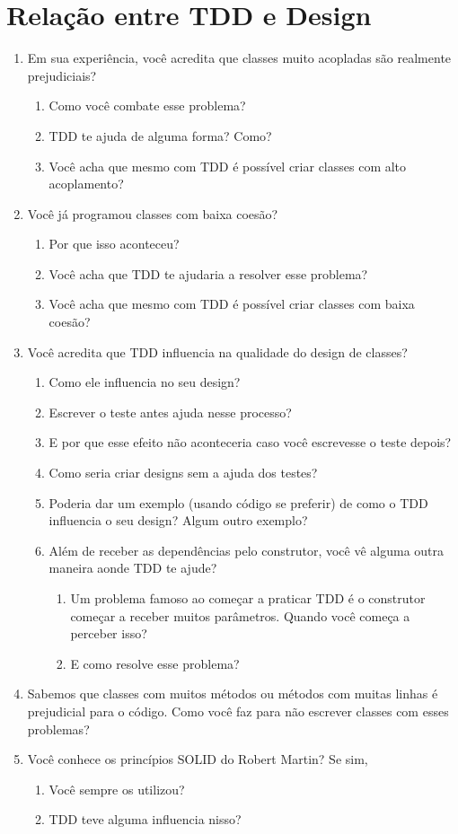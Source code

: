 \section{Relação entre TDD e Design}

\begin{enumerate}
	\item{Em sua experiência, você acredita que classes muito acopladas são realmente prejudiciais?}
		\begin{enumerate}
			\item Como você combate esse problema?
			\item TDD te ajuda de alguma forma? Como?
			\item Você acha que mesmo com TDD é possível criar classes com alto acoplamento? 
		\end{enumerate}
	\item{Você já programou classes com baixa coesão?}
		\begin{enumerate}
			\item Por que isso aconteceu?
			\item Você acha que TDD te ajudaria a resolver esse problema?
			\item Você acha que mesmo com TDD é possível criar classes com baixa coesão? 
		\end{enumerate}
	\item Você acredita que TDD influencia na qualidade do design de classes?
	\begin{enumerate}
		\item Como ele influencia no seu design?
		\item Escrever o teste antes ajuda nesse processo?
		\item E por que esse efeito não aconteceria caso você escrevesse o teste depois?
		\item Como seria criar designs sem a ajuda dos testes?
		\item Poderia dar um exemplo (usando código se preferir) de como o TDD influencia o seu design? Algum outro exemplo?
		\item Além de receber as dependências pelo construtor, você vê alguma outra maneira aonde TDD te ajude?
			\begin{enumerate}
				\item Um problema famoso ao começar a praticar TDD é o construtor começar a receber muitos parâmetros. Quando você começa a perceber isso?
				\item E como resolve esse problema?
			\end{enumerate}
	\end{enumerate}
	\item Sabemos que classes com muitos métodos ou métodos com muitas linhas é prejudicial para o código. Como você faz para não escrever classes com esses problemas?
	\item Você conhece os princípios SOLID do Robert Martin? Se sim,
	\begin{enumerate}
		\item Você sempre os utilizou?
		\item TDD teve alguma influencia nisso?
	\end{enumerate}
\end{enumerate}

